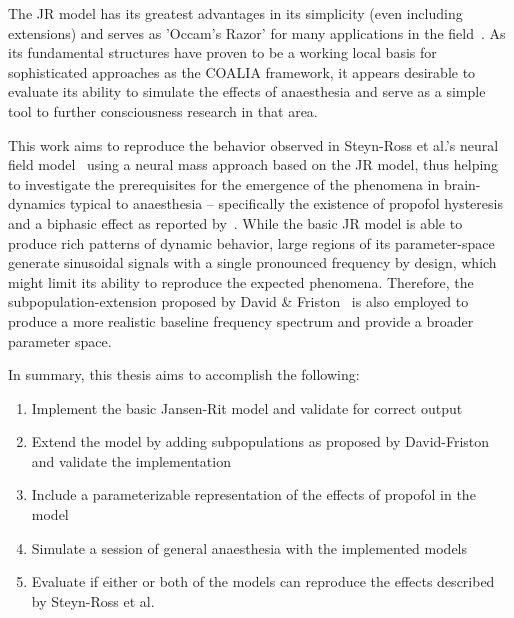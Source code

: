 The JR model has its greatest advantages in its simplicity (even including extensions) and serves as 'Occam's Razor'
for many applications in the field~\cite{kuhlmann_neural_2016}.
As its fundamental structures have proven to be a working local basis for sophisticated approaches as the COALIA
framework,
it appears desirable to evaluate its ability to simulate the effects of anaesthesia and serve as a simple tool to
further consciousness research in that area.

This work aims to reproduce the behavior observed in Steyn-Ross et al.'s neural field model~\cite{hutt_progress_2011}
using a neural mass approach based on the JR model,
thus helping to investigate the prerequisites for the emergence of the phenomena in brain-dynamics typical to
anaesthesia -- specifically the existence of propofol hysteresis
and a biphasic effect as reported by~\cite{hutt_progress_2011}.
While the basic JR model is able to produce rich patterns of dynamic behavior,
large regions of its parameter-space generate sinusoidal signals with a single pronounced frequency by design,
which might limit its ability to reproduce the expected phenomena.
Therefore, the subpopulation-extension proposed by David \& Friston~\cite{david_neural_2003} is also employed to
produce a more realistic baseline frequency spectrum and provide a broader parameter space.

\vspace{1em}
\noindent In summary, this thesis aims to accomplish the following:
\begin{enumerate}[label=\textbf{Goal \arabic*}:, ref=\textbf{Goal~\arabic*}, align=left, leftmargin=*]
    \item Implement the basic Jansen-Rit model and validate for correct output\label{goal:jr_model}
    \item Extend the model by adding subpopulations as proposed by David-Friston and validate the implementation\label{goal:df_model}
    \item Include a parameterizable representation of the effects of propofol in the model \label{goal:implement_propofol}
    \item Simulate a session of general anaesthesia with the implemented models \label{goal:sim_ga}
    \item Evaluate if either or both of the models can reproduce the effects described by Steyn-Ross et al. \label{goal:evaluate}
\end{enumerate}



